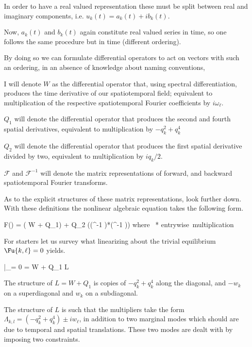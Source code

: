 In order to have a real valued representation these must be split between real and
imaginary components, i.e. $u_k(t) = a_k(t) + i b_k(t)$.

Now, $a_k(t)$ and $b_k(t)$ again constitute real valued series in time, so one follows the same procedure but in time (different ordering).

By doing so we can formulate differential operators to act on vectors with such an ordering,
in an absence of knowledge about naming conventions,

I will denote $W$ as the differential operator that, using spectral
differentiation, produces the time derivative of our spatiotemporal field; equivalent to multiplication of
the respective spatiotemporal Fourier coefficients
by $i \omega_\ell$.

$Q_1$ will denote
the differential operator that produces the second and fourth spatial derivatives, equivalent
to multiplication by $-q_k^2 +q_k^4$

$Q_2$ will denote
the differential operator that produces the first spatial derivative divided by two, equivalent
to multiplication by $i q_k / 2$.

$\mathcal{F}$ and $\mathcal{F}^{-1}$ will denote the matrix representations
of forward, and backward spatiotemporal Fourier transforms.

As to the explicit structures of these matrix representations, look further down.
With these definitions the nonlinear algebraic equation takes the following form.

\beq
F(\Fu) = ( W + Q_1) \Fu + Q_2  ((^{-1} \Fu)*(^{-1} \Fu)) \mbox{where} \, * \equiv \mbox{entrywise multiplication}
\eeq

For starters let us survey what linearizing about the trivial equilibrium $\Fu{k,\ell}=0$ yields.

\beq \label{e-MNGstlintriv}
|_{\Fu = 0} = W + Q_1 \equiv L
\eeq

The structure of $L = W + Q_1$ is copies of $-q_k^2 +q_k^4$ along the diagonal, and $-w_k$ on a
superdiagonal and $w_k$ on a subdiagonal.

The structure of $L$ is such that the multipliers take
the form $\Lambda_{k,l} = (-q_k^2 +q_k^4) \pm i w_\ell$, in addition to two marginal modes which should
are due to temporal and spatial translations. These two modes are dealt with by imposing two constraints.



